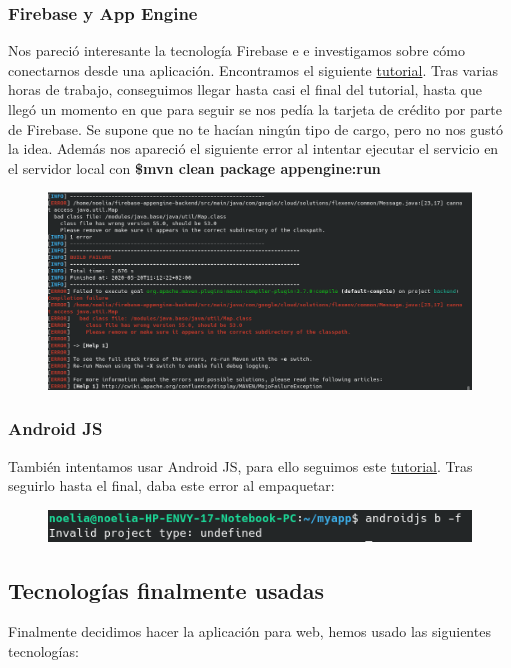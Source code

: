 \documentclass{article}
\begin{document}
 	\subsubsection{Firebase y App Engine}
 	Nos pareció interesante la tecnología Firebase e
 	e investigamos sobre cómo conectarnos desde una aplicación. Encontramos el siguiente \href{https://cloud.google.com/solutions/mobile/mobile-firebase-app-engine-flexible}{tutorial}. Tras varias horas de trabajo, conseguimos llegar hasta casi el final del tutorial, hasta que llegó un momento en que para seguir se nos pedía la tarjeta de crédito por parte de Firebase. Se supone que no te hacían ningún tipo de cargo, pero no nos gustó la idea. Además nos apareció el siguiente error al intentar ejecutar el servicio en el servidor local con {\bf \$mvn clean package appengine:run}
 	\begin{figure}[H]
 		\centering
 		\includegraphics[totalheight=5.7cm]{img/3.png}
 	\end{figure}
 	\subsubsection{Android JS}
 	También intentamos usar Android JS, para ello seguimos este \href{https://blog.usejournal.com/how-to-build-android-apps-with-node-js-using-android-js-2aa4643be87b}{tutorial}. Tras seguirlo hasta el final, daba este error al empaquetar:
 	\begin{figure}[H]
 		\centering
 		\includegraphics[totalheight=0.92cm]{img/4.png}
 	\end{figure}
 	\subsection{Tecnologías finalmente usadas}
 	Finalmente decidimos hacer la aplicación para web, hemos usado las siguientes tecnologías:
\end{document}
